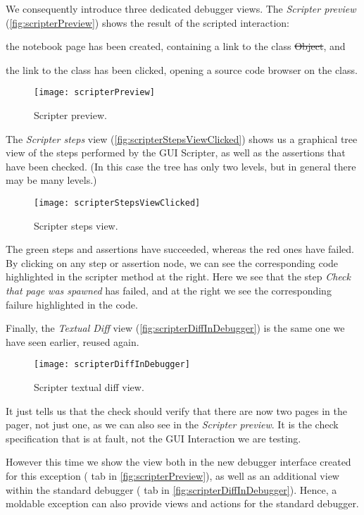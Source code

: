 \documentclass[sigplan,screen]{acmart} %
\newcommand{\GT}{\lst{GT}\xspace} %
\begin{document}
We consequently introduce three dedicated debugger views.
The \emph{Scripter preview} (\autoref{fig:scripterPreview}) shows the result of the scripted interaction:
\begin{inparaenum}[(i)]
	\item the notebook page has been created, containing a link to the class \st{Object}, and
	\item the link to the class has been clicked, opening a source code browser on the class.
\end{inparaenum}
\begin{figure}[h]
  \texttt{[image: scripterPreview]}
  \caption{Scripter preview.}
  \label{fig:scripterPreview}
\end{figure}

The \emph{Scripter steps} view (\autoref{fig:scripterStepsViewClicked}) shows us a graphical tree view of the steps performed by the GUI Scripter, as well as the assertions that have been checked.
(In this case the tree has only two levels, but in general there may be many levels.)
\begin{figure}[h]
  \texttt{[image: scripterStepsViewClicked]}
  \caption{Scripter steps view.}
  \label{fig:scripterStepsViewClicked}
\end{figure}
The green steps and assertions have succeeded, whereas the red ones have failed.
By clicking on any step or assertion node, we can see the corresponding code highlighted in the scripter method at the right.
Here we see that the step \emph{Check that page was spawned} has failed, and at the right we see the corresponding failure highlighted in the code.

Finally, the \emph{Textual Diff} view (\autoref{fig:scripterDiffInDebugger}) is the same one we have seen earlier, reused again.
\begin{figure}[h]
  \texttt{[image: scripterDiffInDebugger]}
  \caption{Scripter textual diff view.}
  \label{fig:scripterDiffInDebugger}
\end{figure}
It just tells us that the check should verify that there are now two pages in the pager, not just one, as we can also see in the \emph{Scripter preview}.
It is the check specification that is at fault, not the GUI Interaction we are testing.

However this time we show the  view both in the new debugger interface created for this exception ( tab in \autoref{fig:scripterPreview}), as well as an additional view within the standard \GT debugger ( tab in \autoref{fig:scripterDiffInDebugger}).
Hence, a moldable exception can also provide views and actions for the standard \GT debugger.
\end{document}
